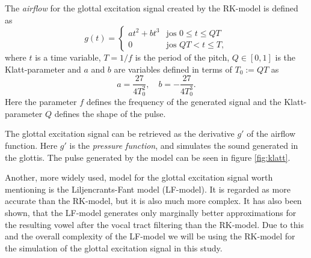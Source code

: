 \documentclass[12pt,a4]{article}
\begin{document}
The \emph{airflow} for the glottal excitation signal created by the RK-model is defined as
\begin{equation}
\label{eq:RK-model}
g(t) =
  \begin{cases}
   at^2 + bt^3  & \text{jos } 0 \leq t \leq Q T \\
   0            & \text{jos } Q T < t \leq T,
  \end{cases}
\end{equation}
where $t$ is a time variable, $T = 1/f$ is the period of the pitch, $Q \in \left[ 0,1 \right]$ is the Klatt-parameter and $a$ and $b$ are variables defined in terms of $T_0 := QT$ as
\begin{equation*}
a = \frac{27}{4 T_0^2}, \quad b = -\frac{27}{4 T_0^3} .
\end{equation*}
Here the parameter $f$ defines the frequency of the generated signal and the Klatt-parameter $Q$ defines the shape of the pulse.

The glottal excitation signal can be retrieved as the derivative $g'$ of the airflow function. Here $g'$ is the \emph{pressure function}, and simulates the sound generated in the glottis. The pulse generated by the model can be seen in figure \ref{fig:klatt}.

Another, more widely used, model for the glottal excitation signal worth mentioning is the Liljencrants-Fant model (LF-model).\cite{fant} It is regarded as more accurate than the RK-model, but it is also much more complex. It has also been shown, that the LF-model generates only marginally better approximations for the resulting vowel after the vocal tract filtering than the RK-model.\cite{fujisaki} Due to this and the overall complexity of the LF-model we will be using the RK-model for the simulation of the glottal excitation signal in this study.
\end{document}
